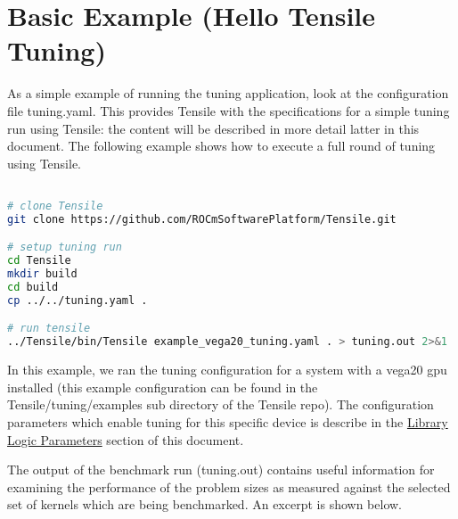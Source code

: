 \documentclass[]{article}
\begin{document}
\section{Basic Example (Hello Tensile Tuning)}

As a simple example of running the tuning application, look at the configuration file tuning.yaml. This provides Tensile with the specifications for a simple tuning run using Tensile: the content will be described in more detail latter in this document. The following example shows how to execute a full round of tuning using Tensile.

\begin{lstlisting}[language=bash,breaklines=true]

# clone Tensile
git clone https://github.com/ROCmSoftwarePlatform/Tensile.git

# setup tuning run
cd Tensile
mkdir build
cd build
cp ../../tuning.yaml .

# run tensile
../Tensile/bin/Tensile example_vega20_tuning.yaml . > tuning.out 2>&1
\end{lstlisting}

In this example, we ran the tuning configuration for a system with a vega20 gpu installed (this example configuration can be found in the Tensile/tuning/examples sub directory of the Tensile repo). The configuration parameters which enable tuning for this specific device is describe in the  \hyperref[sec:LibraryLogic]{Library  Logic Parameters} section of this document.

The output of the benchmark run (tuning.out) contains useful information for examining the performance of the problem sizes as measured against the selected set of kernels which are being benchmarked. An excerpt is shown below.
\end{document}
